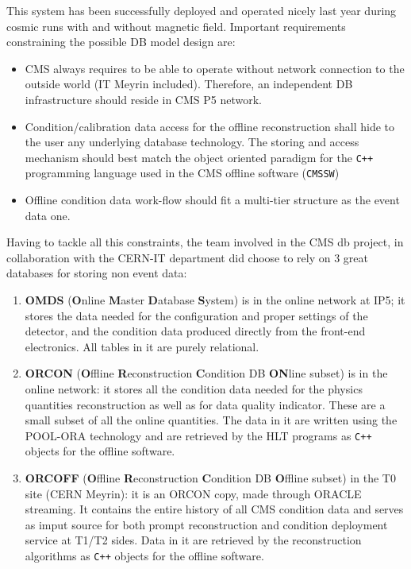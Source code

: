 \documentclass[a4paper]{jpconf}
\begin{document}
This system has been successfully deployed and operated nicely last year during cosmic runs with and without magnetic field.    
Important requirements constraining the possible DB model design are:
\begin{itemize}
\item CMS always requires to be able to operate without network connection to the outside world (IT Meyrin included). Therefore, an independent DB infrastructure should reside in CMS P5 network.
\item Condition/calibration data access for the offline reconstruction shall hide to the user any underlying database technology. The storing and access mechanism should best match the object oriented paradigm for the \texttt{C++} programming language used in the CMS offline software (\texttt{CMSSW}\cite{CMSSW})  
\item Offline condition data work-flow should fit a multi-tier structure as the event data one.
\end{itemize}

Having to tackle all this constraints, the team involved in the CMS db project, in collaboration with the CERN-IT department did choose to rely on 3 great databases for storing non event data:
\begin{enumerate}
\item {\textbf{OMDS}}  ({\textbf{O}}nline {\textbf{M}}aster {\textbf{D}atabase} {\textbf{S}}ystem) is in the online network at IP5; it stores the data needed for the configuration and proper settings of the detector, and the condition data produced directly from the front-end electronics. 
All tables in it are purely relational.
\item {\textbf{ORCON}} ({\textbf{O}}ffline {\textbf{R}}econstruction  {\textbf{C}ondition} DB {\textbf{ON}}line subset) is in the online  network: it stores all the condition data needed for the physics quantities reconstruction as well as for data quality indicator. 
These are a small subset of all the online quantities.
The data in it are written using the POOL-ORA\cite{POOLORA} technology and are retrieved by the HLT programs as {\texttt{C++}} objects for the offline software.  
\item  {\textbf{ORCOFF}} ({\textbf{O}}ffline {\textbf{R}}econstruction  {\textbf{C}ondition} DB {\textbf{O}}ffline subset) in the T0 site (CERN Meyrin): it is an ORCON copy, made through ORACLE streaming. It contains the entire history of all CMS condition data and serves as imput source for both prompt reconstruction and condition deployment service at T1/T2 sides. 
Data in it are retrieved by the reconstruction algorithms as \texttt{C++} objects for the offline software. 
\end{enumerate}
\end{document}
